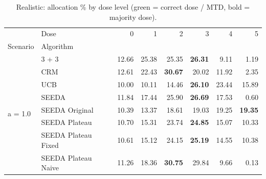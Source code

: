 \begin{table}[H]
\centering
\caption{Realistic: allocation \% by dose level (green = correct dose / MTD, bold = majority dose).}
\label{tab:real_alloc_by_dose}
\begin{tabular}{llrrrrrr}
\toprule
 & Dose & 0 & 1 & 2 & 3 & 4 & 5 \\
Scenario & Algorithm &  &  &  &  &  &  \\
\midrule
\multirow[c]{8}{*}{a = 1.0} & 3 + 3 & 12.66 & 25.38 & {\cellcolor[HTML]{C8E6C9}} 25.35 & \bfseries 26.31 & 9.11 & 1.19 \\
 & CRM & 12.61 & 22.43 & {\cellcolor[HTML]{C8E6C9}} \bfseries 30.67 & 20.02 & 11.92 & 2.35 \\
 & UCB & 10.00 & 10.11 & {\cellcolor[HTML]{C8E6C9}} 14.46 & \bfseries 26.10 & 23.44 & 15.89 \\
 & SEEDA & 11.84 & 17.44 & {\cellcolor[HTML]{C8E6C9}} 25.90 & \bfseries 26.69 & 17.53 & 0.60 \\
 & SEEDA Original & 10.39 & 13.37 & {\cellcolor[HTML]{C8E6C9}} 18.61 & 19.03 & 19.25 & \bfseries 19.35 \\
 & SEEDA Plateau & 10.70 & 15.31 & {\cellcolor[HTML]{C8E6C9}} 23.74 & \bfseries 24.85 & 15.07 & 10.33 \\
 & SEEDA Plateau Fixed & 10.61 & 15.12 & {\cellcolor[HTML]{C8E6C9}} 24.15 & \bfseries 25.19 & 14.55 & 10.38 \\
 & SEEDA Plateau Naive & 11.26 & 18.36 & {\cellcolor[HTML]{C8E6C9}} \bfseries 30.75 & 29.84 & 9.66 & 0.13 \\
\bottomrule
\end{tabular}
\end{table}
